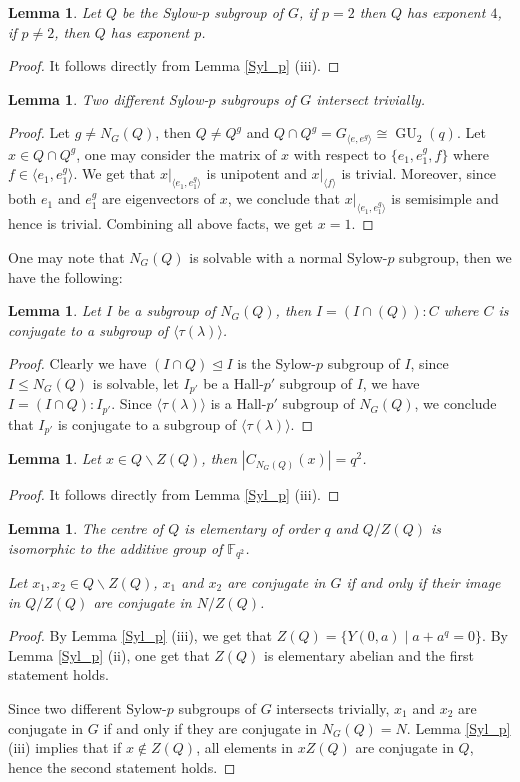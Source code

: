 \documentclass[12pt,reqno]{amsart}
\newcommand{\GU}{\operatorname{GU}}
\newcommand{\FF}{\mathbb{F}}
\newcommand{\lr}{\langle}
\newcommand{\rr}{\rangle}
\theoremstyle{plain}
\newtheorem{lemma}[proposition]{Lemma}
\theoremstyle{definition}
\begin{document}
\begin{lemma}
	Let $Q$ be the Sylow-$p$ subgroup of $G$, if $p=2$ then $Q$ has exponent $4$, if $p\neq 2$, then $Q$ has exponent $p$.  
\end{lemma}
\begin{proof}
	It follows directly from Lemma \ref{Syl_p} (iii).
\end{proof}
\begin{lemma}\label{Sylp_int}
	Two different Sylow-$p$ subgroups of $G$ intersect trivially.
\end{lemma}
\begin{proof}
	Let $g\neq N_G(Q)$, then $Q\neq Q^g$ and $Q\cap Q^g=G_{\lr e, e^g \rr }\cong \GU_2(q)$. Let $x\in Q\cap Q^g$, one may consider the matrix of $x$ with respect to $\{e_1,e_1^g,f\}$ where $f\in \lr e_1,e_1^g \rr$. We get that $x|_{\lr e_1,e_1^g \rr}$ is  unipotent and $x|_{\lr f \rr}$ is trivial. 
	Moreover, since both $e_1$ and $e_1^g$ are eigenvectors of $x$, we conclude that $x|_{\lr e_1, e_1^g\rr} $ is semisimple and hence is trivial. Combining all above facts, we get $x=1$.	
\end{proof}
One may note that $N_G(Q)$ is solvable with a normal Sylow-$p$ subgroup, then we have the following:
\begin{lemma}\label{subgp}
	Let $I$ be a subgroup of $N_G(Q)$, then $I=(I\cap (Q)){:}C$ where $C$ is conjugate to a subgroup of $\lr \tau(\lambda) \rr$.
\end{lemma}
\begin{proof}
	Clearly we have $(I\cap Q)\trianglelefteq I $ is the Sylow-$p$ subgroup of $I$, since $I\le N_G(Q)$ is solvable, let $I_{p'}$ be a Hall-$p'$ subgroup of $I$, we have $I=(I\cap Q){:}I_{p'}$. 
	Since $\lr \tau(\lambda) \rr$  is a Hall-$p'$ subgroup of $N_{G}(Q)$, we conclude that  $I_{p'}$ is conjugate to a subgroup of $\lr \tau(\lambda) \rr$. 
\end{proof}
\begin{lemma}
	Let $x\in Q\backslash Z(Q)$, then $|C_{N_G(Q)}(x)|=q^2$.
\end{lemma}
\begin{proof}
	It follows directly from Lemma \ref{Syl_p} (iii).
\end{proof}
\begin{lemma}\label{conjp}
	The centre of  $Q$ is elementary of order $q$ and $Q/Z(Q)$ is isomorphic to the additive group of $\FF_{q^2}$.
	
	Let $x_1,x_2\in Q\backslash Z(Q)$, $x_1$ and $x_2$ are conjugate in $G$ if and only if their image in 
	$Q/Z(Q)$ are conjugate in $N/Z(Q)$.
\end{lemma}
\begin{proof}
	By Lemma \ref{Syl_p} (iii), we get that $Z(Q)=\{Y(0,a)\mid a+a^q=0 \}$. 
	By Lemma \ref{Syl_p} (ii), one get that $Z(Q)$ is elementary abelian and the first statement holds.
	
	Since two different Sylow-$p$ subgroups of $G$ intersects trivially, $x_1$ and $x_2$ are conjugate in $G$ if and only if they are conjugate in $N_G(Q)=N$.
	Lemma \ref{Syl_p}(iii) implies that if $x\notin Z(Q)$, all elements in  $xZ(Q)$ are conjugate in $Q$, 
	hence the second statement holds.
\end{proof}
\end{document}
